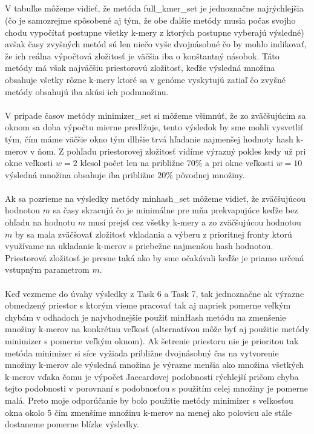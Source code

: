\documentclass[a4paper]{article}
\begin{document}
\subsection{}

\subsection{}
V tabuľke môžeme vidieť, že metóda full\_kmer\_set je jednoznačne najrýchlejšia (čo je samozrejme spôsobené aj tým, že obe ďalšie metódy musia počas svojho chodu vypočítať postupne všetky k-mery z ktorých postupne vyberajú výsledné) avšak časy zvyšných metód sú len niečo vyše dvojnásobné čo by mohlo indikovať, že ich reálna výpočtová zložitosť je väčšia iba o konštantný násobok. Táto metódy má však najväčšiu priestorovú zložitosť, keďže výsledná množina obsahuje všetky rôzne k-mery ktoré sa v genóme vyskytujú zatiaľ čo zvyšné metódy obsahujú iba akúsi ich podmnožinu.
\\
\\
V prípade časov metódy minimizer\_set si môžeme všimnúť, že zo zväčšujúcim sa oknom sa doba výpočtu mierne predlžuje, tento výsledok by sme mohli vysvetliť tým, čím máme väčšie okno tým dlhšie trvá hľadanie najmenšej hodnoty hash k-merov v ňom. Z pohľadu priestorovej zložitosť vidíme výrazný pokles kedy už pri okne veľkosti $w=2$ klesol počet len na približne $70\%$ a pri okne veľkosti $w=10$ výsledná množina obsahuje iba približne $20\%$ pôvodnej množiny.
\\
\\
Ak sa pozrieme na výsledky metódy minhash\_set môžeme vidieť, že zväčšujúcou hodnotou $m$ sa časy skracujú čo je minimálne pre mňa prekvapujúce keďže bez ohľadu na hodnotu $m$ musí prejsť cez všetky k-mery a zo zväčšujúcou hodnotou $m$ by sa mala zväčšovať zložitosť vkladania a výberu z prioritnej fronty ktorú využívame na ukladanie k-merov s priebežne najmenšou hash hodnotou. Priestorová zložitosť je presne taká ako by sme očakávali keďže je priamo určená vstupným parametrom $m$.
\\
\\
Keď vezmeme do úvahy výsledky z Task 6 a Task 7, tak jednoznačne ak výrazne obmedzený priestor s ktorým vieme pracovať tak aj napriek pomerne veľkým chybám v odhadoch je najvhodnejšie použiť minHash metódu na zmenšenie množiny k-merov na konkrétnu veľkosť (alternatívou môže byť aj použitie metódy minimizer s pomerne veľkým oknom).
Ak šetrenie priestoru nie je prioritou tak metóda minimizer si síce vyžiada približne dvojnásobný čas na vytvorenie množiny k-merov ale výsledná množina je výrazne menšia ako množina všetkých k-merov vďaka čomu je výpočet Jaccardovej podobnosti rýchlejší pričom chyba tejto podobnosti v porovnaní s podobnosťou s použitím celej množiny je pomerne malá.
Preto moje odporúčanie by bolo použitie metódy minimizer s veľkosťou okna okolo 5 čím zmenšíme množinu k-merov na menej ako polovicu ale stále dostaneme pomerne blízke výsledky.
\end{document}
